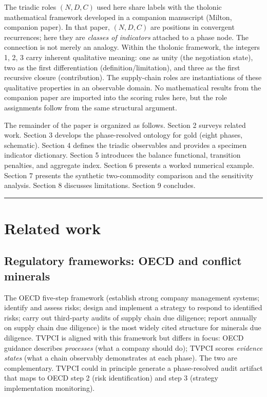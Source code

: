 \documentclass[12pt]{article}
\begin{document}
The triadic roles \((N, D, C)\) used here share labels with the tholonic
mathematical framework developed in a companion manuscript (Milton,
companion paper). In that paper, \((N, D, C)\) are positions in
convergent recurrences; here they are \emph{classes of indicators}
attached to a phase node. The connection is not merely an analogy.
Within the tholonic framework, the integers 1, 2, 3 carry inherent
qualitative meaning: one as unity (the negotiation state), two as the
first differentiation (definition/limitation), and three as the first
recursive closure (contribution). The supply-chain roles are
instantiations of these qualitative properties in an observable domain.
No mathematical results from the companion paper are imported into the
scoring rules here, but the role assignments follow from the same
structural argument.

The remainder of the paper is organized as follows. Section 2 surveys
related work. Section 3 develops the phase-resolved ontology for gold
(eight phases, schematic). Section 4 defines the triadic observables and
provides a specimen indicator dictionary. Section 5 introduces the
balance functional, transition penalties, and aggregate index. Section 6
presents a worked numerical example. Section 7 presents the synthetic
two-commodity comparison and the sensitivity analysis. Section 8
discusses limitations. Section 9 concludes.

\begin{center}\rule{0.5\linewidth}{0.5pt}\end{center}

\section{Related work}\label{related-work}

\subsection{Regulatory frameworks: OECD and conflict minerals}\label{regulatory-frameworks-oecd-and-conflict-minerals}

The OECD five-step framework (establish strong company management
systems; identify and assess risks; design and implement a strategy to
respond to identified risks; carry out third-party audits of supply
chain due diligence; report annually on supply chain due diligence) is
the most widely cited structure for minerals due diligence. TVPCI is
aligned with this framework but differs in focus: OECD guidance
describes \emph{processes} (what a company should do); TVPCI scores
\emph{evidence states} (what a chain observably demonstrates at each
phase). The two are complementary. TVPCI could in principle generate a
phase-resolved audit artifact that maps to OECD step 2 (risk
identification) and step 3 (strategy implementation monitoring).
\end{document}
